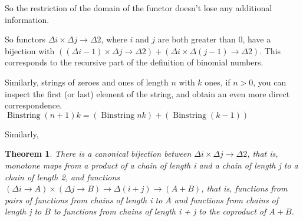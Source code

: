 \documentclass{proc-l}
\newtheorem{theorem}{Theorem}[section]
\theoremstyle{definition}
\theoremstyle{remark}
\numberwithin{equation}{section}
\begin{document}
So the restriction of the domain of the functor doesn't lose any additional information.

So functors \(\Delta i \times \Delta j \to \Delta 2\), where \(i\) and \(j\) are both greater than 0, have a bijection with \(((\Delta i-1) \times \Delta j \to \Delta 2) + (\Delta i \times \Delta (j-1) \to \Delta 2)\). This corresponds to the recursive part of the definition of binomial numbers.

Similarly, strings of zeroes and ones of length \(n\) with \(k\) ones, if \(n > 0\), you can inspect the first (or last) element of the string, and obtain an even more direct correspondence. \(\operatorname{Binstring} (n+1) k = (\operatorname{Binstring} n k) + (\operatorname{Binstring}  (k-1))\)

Similarly, 



\begin{theorem}
There is a canonical bijection between \(\Delta i \times \Delta j \to \Delta 2\), that is, monotone maps from a product of a chain of length i and a chain of length j to a chain of length 2, and functions \((\Delta i \to A) \times (\Delta j \to B) \to \Delta (i + j) \to (A + B)\),
that is, functions from pairs of functions from chains of length i to \(A\) and functions from chains of length j to \(B\) to functions from chains of length i + j to the coproduct of \(A + B\).
\end{theorem}
\end{document}
